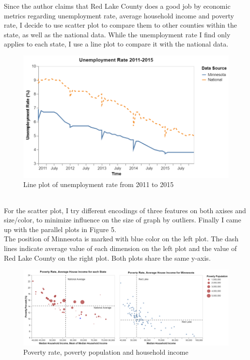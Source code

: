 \documentclass{article}
\begin{document}
Since the author claims that Red Lake County does a good job by economic metrics regarding unemployment rate, average household income and poverty rate, I decide to use scatter plot to compare them to other counties within the state, as well as the national data. While the unemployment rate I find only applies to each state, I use a line plot to compare it with the national data. \\
\begin{figure}[htbp]
    \centering
    \includegraphics[scale=0.4]{ER.png}
    \caption{Line plot of unemployment rate from 2011 to 2015}
\end{figure} \\
\noindent
For the scatter plot, I try different encodings of three features on both axises and size/color, to minimize influence on the size of graph by outliers. Finally I came up with the parallel plots in Figure 5. \\
\noindent
The position of Minnesota is marked with blue color on the left plot. The dash lines indicate average value of each dimension on the left plot and the value of Red Lake County on the right plot. Both plots share the same y-axis. \\
\begin{figure}[htbp]
    \centering
    \includegraphics[scale=0.3]{EM.png}
    \caption{Poverty rate, poverty population and household income}
\end{figure}
\end{document}

